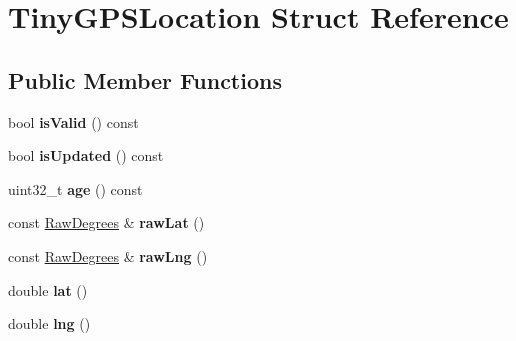 \hypertarget{struct_tiny_g_p_s_location}{}\section{Tiny\+G\+P\+S\+Location Struct Reference}
\label{struct_tiny_g_p_s_location}
\subsection*{Public Member Functions}
\begin{DoxyCompactItemize}
\item 
bool {\bfseries is\+Valid} () const \hypertarget{struct_tiny_g_p_s_location_a783c2898915440f51a6df233aba51923}{}\label{struct_tiny_g_p_s_location_a783c2898915440f51a6df233aba51923}

\item 
bool {\bfseries is\+Updated} () const \hypertarget{struct_tiny_g_p_s_location_a9aae0a5fd73c2dab231309f1dd3b2c0a}{}\label{struct_tiny_g_p_s_location_a9aae0a5fd73c2dab231309f1dd3b2c0a}

\item 
uint32\+\_\+t {\bfseries age} () const \hypertarget{struct_tiny_g_p_s_location_ada111e1b74f82dc029c0c61241424ca8}{}\label{struct_tiny_g_p_s_location_ada111e1b74f82dc029c0c61241424ca8}

\item 
const \hyperlink{struct_raw_degrees}{Raw\+Degrees} \& {\bfseries raw\+Lat} ()\hypertarget{struct_tiny_g_p_s_location_abe2a4fbfe28299aae87c5b4c3c58bcad}{}\label{struct_tiny_g_p_s_location_abe2a4fbfe28299aae87c5b4c3c58bcad}

\item 
const \hyperlink{struct_raw_degrees}{Raw\+Degrees} \& {\bfseries raw\+Lng} ()\hypertarget{struct_tiny_g_p_s_location_a9fe126feca0bdcfa9224a428b86d68db}{}\label{struct_tiny_g_p_s_location_a9fe126feca0bdcfa9224a428b86d68db}

\item 
double {\bfseries lat} ()\hypertarget{struct_tiny_g_p_s_location_a86c3acea4f317b427eebb667e4d05a49}{}\label{struct_tiny_g_p_s_location_a86c3acea4f317b427eebb667e4d05a49}

\item 
double {\bfseries lng} ()\hypertarget{struct_tiny_g_p_s_location_a544e9009a5580b2fd5466821a5e5b782}{}\label{struct_tiny_g_p_s_location_a544e9009a5580b2fd5466821a5e5b782}

\end{DoxyCompactItemize}
